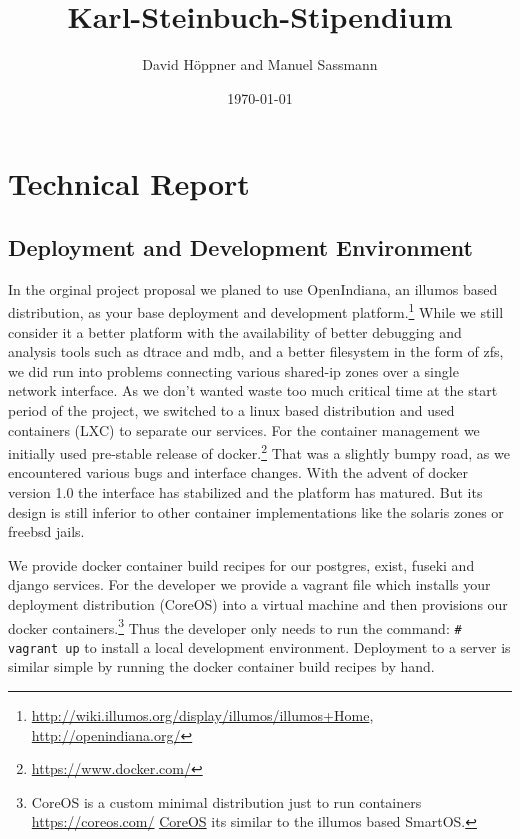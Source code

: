 \documentclass[12pt, draft]{article}
\begin{document}
\title{Karl-Steinbuch-Stipendium}
\author{David Höppner and Manuel Sassmann}
\date{\today}
\maketitle

\begin{abstract}
\end{abstract}

\section{Technical Report}

\subsection{Deployment and Development Environment}

In the orginal project proposal we planed to use OpenIndiana,
an illumos based distribution, as your base deployment and development
platform.\footnote{\url{http://wiki.illumos.org/display/illumos/illumos+Home}, \url{http://openindiana.org/}}
While we still consider it a better platform with
the availability of better debugging and analysis tools
such as dtrace and mdb, and a better filesystem in the form of zfs,
we did run into problems connecting various shared-ip zones over a single network interface.
As we don't wanted waste too much critical time at the
start period of the project, we switched to a linux based
distribution and used containers (LXC) to separate our
services.  For the container management we initially
used pre-stable release of docker.\footnote{\url{https://www.docker.com/}}
That was a slightly
bumpy road, as we encountered various bugs and interface changes.
With the advent of docker version 1.0 the interface has
stabilized and the platform has matured.
But its design is still inferior to other
container implementations like the solaris zones or freebsd jails.

We provide docker container build recipes for our
postgres, exist, fuseki and django services.
For the developer we provide a vagrant file which 
installs your deployment distribution (CoreOS)
into a virtual machine and then provisions our
docker containers.\footnote{CoreOS is a custom minimal distribution just to run
containers \url{https://coreos.com/} \href{https://coreos.com/}{CoreOS} its similar to the illumos based SmartOS.}
Thus the developer only needs to run the command: \lstinline´# vagrant up´
to install a local development environment.
Deployment to a server is similar simple by running the docker container build recipes
by hand.
\end{document}
